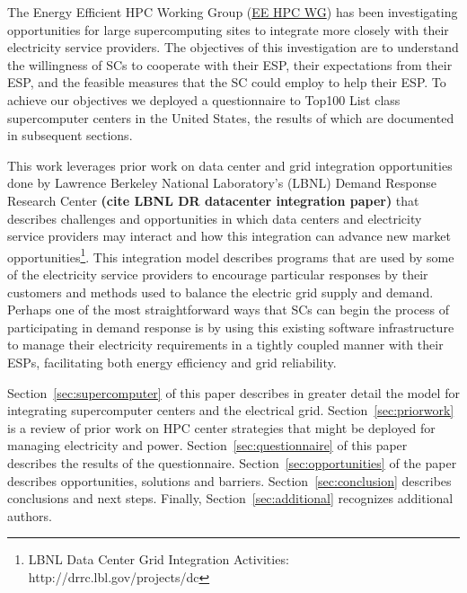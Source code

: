 The Energy Efficient HPC Working Group (\href {http://eehpcwg.lbl.gov/}{EE HPC WG})  
has been investigating opportunities for large supercomputing sites to  
integrate more closely with their electricity service providers.
The objectives of this investigation are to understand the willingness of SCs to
cooperate with their ESP, their expectations from their ESP, and the feasible measures
that the SC could employ to help their ESP.
To achieve our objectives we deployed a questionnaire to
Top100 List class supercomputer centers in the United States, the results of
which are documented in subsequent sections.

This work leverages prior work on data center and grid integration opportunities
done by Lawrence Berkeley National Laboratory's (LBNL) Demand Response 
Research Center \textbf{(cite LBNL DR datacenter integration paper)}
that describes challenges and opportunities in which data centers and electricity
service providers may interact and how this integration can advance 
new market 
opportunities\footnote{LBNL Data Center Grid Integration Activities: http://drrc.lbl.gov/projects/dc}.
This integration model describes programs that are used by some of the electricity 
service providers to encourage particular responses by their customers and methods 
used to balance the electric grid supply and demand.
Perhaps one of the most straightforward ways that SCs can begin
the process of participating in demand response is by using this existing software 
infrastructure to manage their electricity requirements in a tightly coupled manner 
with their ESPs, facilitating both energy efficiency and grid reliability.

Section~\ref{sec:supercomputer}  of this paper describes in greater detail the model for
integrating supercomputer centers and the electrical grid. Section~\ref{sec:priorwork}
is a review of prior work on HPC center strategies that might be
deployed for managing electricity and power. Section~\ref{sec:questionnaire} of this paper
describes the results of the questionnaire. Section~\ref{sec:opportunities} of the paper
describes opportunities, solutions and barriers. Section~\ref{sec:conclusion} describes
conclusions and next steps. Finally, Section~\ref{sec:additional} recognizes additional
authors.

